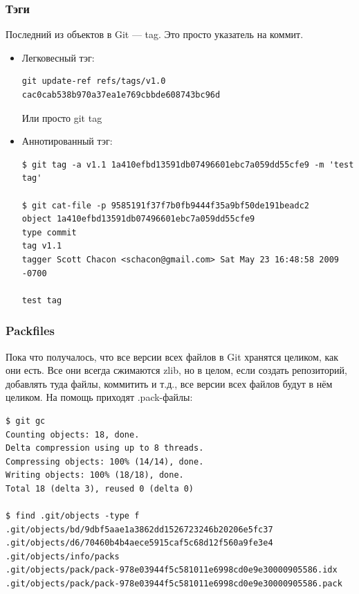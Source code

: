 \documentclass{../../slides-style}
\begin{document}
    \begin{frame}[fragile]
        \frametitle{Тэги}
        Последний из объектов в Git --- tag. Это просто указатель на коммит.
        \begin{footnotesize}
            \begin{itemize}
                \item Легковесный тэг:
                    \begin{verbatim}
git update-ref refs/tags/v1.0 cac0cab538b970a37ea1e769cbbde608743bc96d
                    \end{verbatim}
                    Или просто git tag
                \item Аннотированный тэг:
                    \begin{verbatim}
$ git tag -a v1.1 1a410efbd13591db07496601ebc7a059dd55cfe9 -m 'test tag'

$ git cat-file -p 9585191f37f7b0fb9444f35a9bf50de191beadc2
object 1a410efbd13591db07496601ebc7a059dd55cfe9
type commit
tag v1.1
tagger Scott Chacon <schacon@gmail.com> Sat May 23 16:48:58 2009 -0700

test tag
                    \end{verbatim}
            \end{itemize}
        \end{footnotesize}
    \end{frame}

    \begin{frame}[fragile]
        \frametitle{Packfiles}
        Пока что получалось, что все версии всех файлов в Git хранятся целиком, как они есть. Все они всегда сжимаются zlib, но в целом, если создать репозиторий, добавлять туда файлы, коммитить и т.д., все версии всех файлов будут в нём целиком. На помощь приходят .pack-файлы:
        \begin{footnotesize}
            \begin{verbatim}
$ git gc
Counting objects: 18, done.
Delta compression using up to 8 threads.
Compressing objects: 100% (14/14), done.
Writing objects: 100% (18/18), done.
Total 18 (delta 3), reused 0 (delta 0)

$ find .git/objects -type f
.git/objects/bd/9dbf5aae1a3862dd1526723246b20206e5fc37
.git/objects/d6/70460b4b4aece5915caf5c68d12f560a9fe3e4
.git/objects/info/packs
.git/objects/pack/pack-978e03944f5c581011e6998cd0e9e30000905586.idx
.git/objects/pack/pack-978e03944f5c581011e6998cd0e9e30000905586.pack
            \end{verbatim}
        \end{footnotesize}
    \end{frame}
\end{document}
